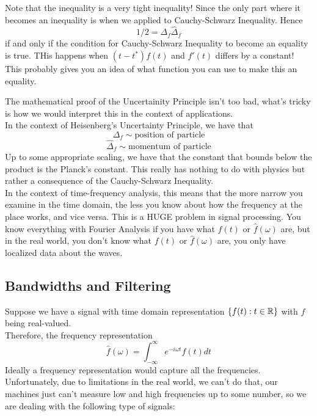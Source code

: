 \documentclass{article}
\begin{document}
\begin{remark}
    Note that the inequality is a very tight inequality! Since the only part where it becomes an inequality is when we applied to Cauchy-Schwarz Inequality. Hence
    \[1/2 = \Delta_f \widehat{\Delta}_f\]
    if and only if the condition for Cauchy-Schwarz Inequality to become an equality is true. THis happens when $(t - t^*) f(t)$ and $f'(t)$ differs by a constant! This probably gives you an idea of what function you can use to make this an equality.
\end{remark}

The mathematical proof of the Uncertainity Principle isn't too bad, what's tricky is how we would interpret this in the context of applications.\\

In the context of Heisenberg's Uncertainty Principle, we have that
\[\Delta_f \sim \text{position of particle}\]
\[\widehat{\Delta}_f \sim \text{momentum of particle}\]
Up to some appropriate scaling, we have that the constant that bounds below the product is the Planck's constant. This really has nothing to do with physics but rather a consequence of the Cauchy-Schwarz Inequality.\\

In the context of time-frequency analysis, this means that the more narrow you examine in the time domain, the less you know about how the frequency at the place works, and vice versa. This is a HUGE problem in signal processing. You know everything with Fourier Analysis if you have what $f(t)$ or $\widehat{f}(\omega)$ are, but in the real world, you don't know what $f(t)$ or $\widehat{f}(\omega)$ are, you only have localized data about the waves.

\subsection{Bandwidths and Filtering}

Suppose we have a signal with time domain representation $\{f(t): t \in \mathbb{R}\}$ with $f$ being real-valued.\\

Therefore, the frequency representation
\[\widehat{f}(\omega) = \int_{-\infty}^\infty e^{-i\omega t} f(t) dt\]
Ideally a frequency representation would capture all the frequencies. Unfortunately, due to limitations in the real world, we can't do that, our machines just can't measure low and high frequencies up to some number, so we are dealing with the following type of signals:
\end{document}
